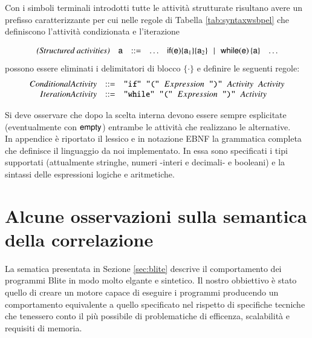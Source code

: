 Con i simboli terminali introdotti tutte le attività strutturate risultano
avere un prefisso caratterizzante per cui nelle regole di Tabella
\ref{tab:syntaxwsbpel} che definiscono l'attività condizionata e l'iterazione  

$$
\begin{array}{rccccl}
\textit{(Structured activities)} & \xs & ::= & \ldots  &
\xif{\xe}{\xs_1}{\xs_2} \!\sepgr\! \xwhile{\xe}{\xs} & \ldots
\end{array}
$$ 
possono essere eliminati i delimitatori di blocco $\{\cdot \}$ e definire le
seguenti regole: $$
\begin{array}{rcl}
ConditionalActivity & ::= & \verb#"if"# \hspace{0.2cm} \verb#"("#
\hspace{0.2cm} Expression \hspace{0.2cm} \verb#")"#  \hspace{0.2cm} Activity
\hspace{0.2cm} Activity \\

IterationActivity & ::= & \verb#"while"# \hspace{0.2cm} \verb#"("#
\hspace{0.2cm} Expression \hspace{0.2cm} \verb#")"#  \hspace{0.2cm} Activity \\
\end{array}
$$

Si deve osservare che dopo la scelta interna devono essere sempre esplicitate
(eventualmente con ${\sf empty}$) entrambe le attività che realizzano le
alternative.
\\

In appendice è riportato il lessico e in notazione EBNF la grammatica completa
che definisce il linguaggio da noi implementato. In essa sono specificati
i tipi supportati (attualmente stringhe, numeri -interi e decimali- e booleani)
e la sintassi delle espressioni logiche e aritmetiche.

\section{Alcune osservazioni sulla semantica della correlazione}
\label{sec:semcor}

La sematica presentata in Sezione \ref{sec:blite} descrive il comportamento dei
programmi Blite in modo molto elgante e sintetico. Il nostro obbiettivo è stato
quello di creare un motore capace di eseguire i programmi producendo un
comportamento equivalente a quello specificato nel rispetto di specifiche
tecniche che tenessero conto il più possibile di problematiche di efficenza,
scalabilità e requisiti di memoria.


